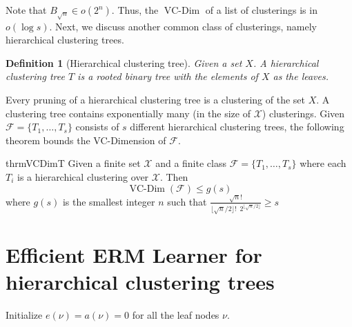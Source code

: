 \documentclass[12pt]{article}
\newtheorem{definition}[theorem]{Definition}
\newcommand{\mc}{\mathcal}
\DeclareMathOperator*{\vcdim}{VC-Dim}
\begin{document}
\noindent Note that $B_{\sqrt n} \in o(2^{n})$. Thus, the $\vcdim$ of a list of clusterings is in $o( \log s)$. Next, we discuss another common class of clusterings, namely hierarchical clustering trees. 

\begin{definition}[Hierarchical clustering tree]
Given a set $X$. A hierarchical clustering tree $T$ is a rooted binary tree with the elements of $X$ as the leaves. 
\end{definition}

\noindent Every pruning of a hierarchical clustering tree is a clustering of the set $X$. A clustering tree contains exponentially many (in the size of $\mc X$) clusterings. Given $\mc F = \{T_1, \ldots, T_s\}$ consists of $s$ different hierarchical clustering trees, the following theorem bounds the VC-Dimension of ${\mc F}$.

\begin{restatable}{thrm}{VCDimT}
Given a finite set $\mc X$ and a finite class $\mc F = \{T_1, \ldots, T_s\}$ where each $T_i$ is a hierarchical clustering over $\mc X$. Then 
$$\vcdim({\mc F}) \le g(s)$$ where $g(s)$ is the smallest integer $n$ such that $\frac{\sqrt n!}{\lfloor \sqrt n/2 \rfloor! \enspace 2^{\lfloor \sqrt n/2 \rfloor}} \ge s $
\end{restatable}


\section{Efficient ERM Learner for hierarchical clustering trees}
\label{section:efficientERM}

\SetAlgoNoLine
\LinesNumbered
\SetNlSkip{-0.4em}
\begin{algorithm}[h]
\caption{ERM approach for a hierarchical clustering tree}
\label{alg:ERMTrees}
\Indp{}

\vspace{0.1in} Initialize $e(\nu) = a(\nu) = 0$ for all the leaf nodes $\nu$. \\
\end{algorithm}
\end{document}
